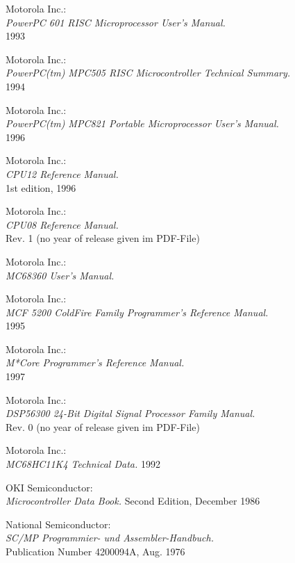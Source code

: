  Motorola Inc.: \\
		{\em PowerPC 601 RISC Microprocessor User's Manual.\/} \\
		1993

 Motorola Inc.: \\
		{\em PowerPC(tm) MPC505 RISC Microcontroller Technical
		Summary.\/} \\
		1994

 Motorola Inc.: \\
		{\em PowerPC(tm) MPC821 Portable Microprocessor User's Manual.\/} \\
		1996

 Motorola Inc.: \\
	{\em CPU12 Reference Manual.\/} \\
	1st edition, 1996

 Motorola Inc.: \\
		{\em CPU08 Reference Manual.\/} \\
		Rev. 1 (no year of release given im PDF-File)

 Motorola Inc.: \\
		{\em MC68360 User's Manual.\/}

 Motorola Inc.: \\
		{\em MCF 5200 ColdFire Family Programmer's Reference
		Manual.\/} \\
		1995

 Motorola Inc.: \\
		{\em M*Core Programmer's Reference Manual.\/} \\
		1997

 Motorola Inc.: \\
		{\em DSP56300 24-Bit Digital Signal Processor
		Family Manual.\/} \\
		Rev. 0 (no year of release given im PDF-File)

 Motorola Inc.: \\
		{\em MC68HC11K4 Technical Data.\/}
		1992

 OKI Semiconductor: \\
		{\em Microcontroller Data Book.\/}
		Second Edition, December 1986

 National Semiconductor: \\
		{\em SC/MP Program\-mier- und
		As\-sem\-bler-Hand\-buch.\/} \\
		Publication Number 4200094A, Aug. 1976

